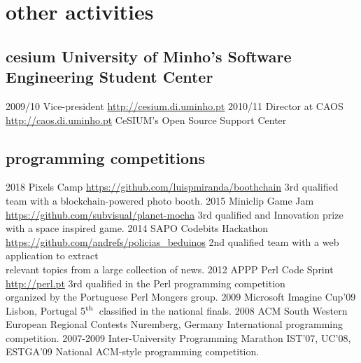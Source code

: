 \documentclass[a4paper]{friggeri-cv}
\begin{document}
\section{other activities}
\subsection{cesium {\normalfont\small University of Minho's Software Engineering Student Center}}{}
\begin{entrylist}
  \entry
    {2009/10}
    {Vice-president}
    {\href{http://cesium.di.uminho.pt}{http://cesium.di.uminho.pt}}
    {\vspace{-.8cm}}
    {}
  \entry
    {2010/11}
    {Director at CAOS}
    {\href{http://caos.di.uminho.pt}{http://caos.di.uminho.pt}}
    {CeSIUM's Open Source Support Center}
    {\vspace{-.5cm}}
\end{entrylist}

\subsection{programming competitions}{}
\begin{entrylist}
  \entry
    {2018}
    {Pixels Camp}
    {\href{https://github.com/luispmiranda/boothchain}{https://github.com/luispmiranda/boothchain}}
    {3rd qualified team with a blockchain-powered photo booth.}
    {\vspace{-.4cm}}
  \entry
    {2015}
    {Miniclip Game Jam}
    {\href{https://github.com/subvisual/planet-mocha}{https://github.com/subvisual/planet-mocha}}
    {3rd qualified and Innovation prize with a space inspired game.}
    {\vspace{-.4cm}}
  \entry
    {2014}
    {SAPO Codebits Hackathon}
    {\href{https://github.com/andrefs/policias\_beduinos}{https://github.com/andrefs/policias\_beduinos}}
    {2nd qualified team with a web application to extract\\
    relevant topics from a large collection of news.}
    {\vspace{-.4cm}}
  \entry
    {2012}
    {APPP Perl Code Sprint}
    {\href{http://perl.pt}{http://perl.pt}}
    {3rd qualified in the Perl programming competition\\organized by the Portuguese Perl Mongers group.}
    {\vspace{-.4cm}}
  \entry
    {2009}
    {Microsoft Imagine Cup'09}
    {Lisbon, Portugal}
    {5$^{\footnotesize\textrm{th}}$~classified in the national finals.}
    {\vspace{-.4cm}}
  \entry
    {2008}
    {ACM South Western European Regional Contests}
    {Nuremberg, Germany}
    {International programming competition.}
    {\vspace{-.4cm}}
  \entry
    {2007-2009}
    {Inter-University Programming Marathon}
    {IST'07, UC'08, ESTGA'09}
    {National ACM-style programming competition.}
    {\vspace{-.4cm}}
\end{entrylist}
\end{document}
